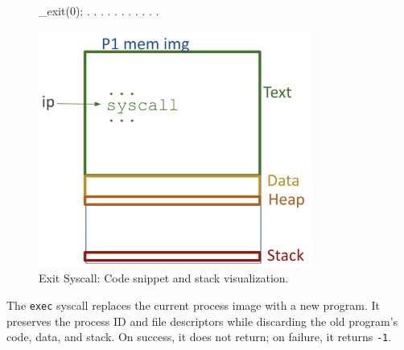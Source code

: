 \begin{figure}[htp]
  \centering
  \begin{minipage}[htp]{0.45\textwidth}
\begin{cc}
_exit(0);
. 
. 
. 
. 
. 
. 
. 
. 
. 
. 
. 
\end{cc}
  \end{minipage}
  \hfill
  \vline
  \hfill
  \begin{minipage}[htp]{0.45\textwidth}
    \centering
    \includegraphics[width=0.8\textwidth]{chapters/L3/images/exit.png}
  \end{minipage}
  \caption{Exit Syscall: Code snippet and stack visualization.}
\end{figure}
\newpage
\begin{definition}
The \texttt{exec} syscall replaces the current process image with a new program. It preserves the process ID and file descriptors while discarding the old program's code, data, and stack. On success, it does not return; on failure, it returns \texttt{-1}.
\end{definition}

